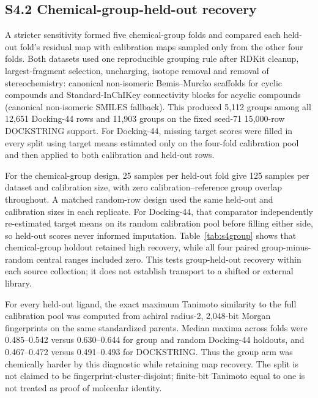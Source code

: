 \documentclass[11pt]{article}
\begin{document}
\subsection*{S4.2 Chemical-group-held-out recovery}

A stricter sensitivity formed five chemical-group folds and compared each
held-out fold's residual map with calibration maps sampled only from the other
four folds. Both datasets used one reproducible grouping rule after RDKit
cleanup, largest-fragment selection, uncharging, isotope removal and removal of
stereochemistry: canonical non-isomeric Bemis--Murcko scaffolds for cyclic
compounds and Standard-InChIKey connectivity blocks for acyclic compounds
(canonical non-isomeric SMILES fallback). This produced 5,112 groups among all
12,651 Docking-44 rows and 11,903 groups on the fixed seed-71 15,000-row
DOCKSTRING support. For
Docking-44, missing target scores were filled in every split using target means
estimated only on the four-fold calibration pool and then applied to both
calibration and held-out rows.

For the chemical-group design, 25 samples per held-out fold give 125 samples
per dataset and calibration size, with zero calibration--reference group
overlap throughout. A matched random-row design used the same held-out and
calibration sizes in each replicate. For Docking-44, that comparator
independently re-estimated target means on its random calibration pool before
filling either side, so held-out scores never informed imputation. Table~\ref{tab:s4group} shows that chemical-group holdout retained
high recovery, while all four paired group-minus-random central ranges included
zero. This tests group-held-out recovery within each source collection; it does
not establish transport to a shifted or external library.

For every held-out ligand, the exact maximum Tanimoto similarity to the full
calibration pool was computed from achiral radius-2, 2,048-bit Morgan
fingerprints on the same standardized parents. Median maxima across folds were
0.485--0.542 versus 0.630--0.644 for group and random Docking-44 holdouts, and
0.467--0.472 versus 0.491--0.493 for DOCKSTRING. Thus the group arm was
chemically harder by this diagnostic while retaining map recovery. The split
is not claimed to be fingerprint-cluster-disjoint; finite-bit Tanimoto equal to
one is not treated as proof of molecular identity.
\end{document}
